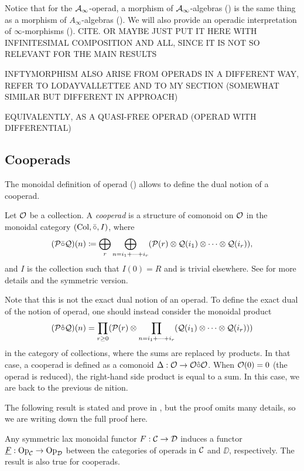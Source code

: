 \documentclass[Thesis.tex]{subfiles}
\begin{document}
Notice that for the $\mathcal{A}_\infty$-operad, a morphism of $\mathcal{A}_\infty$-algebras () is the same thing as a morphism of $A_\infty$-algebras (). We will also provide an operadic interpretation of $\infty$-morphisms (). CITE. OR MAYBE JUST PUT IT HERE WITH INFINITESIMAL COMPOSITION AND ALL, SINCE IT IS NOT SO RELEVANT FOR THE MAIN RESULTS

 INFTYMORPHISM ALSO ARISE FROM OPERADS IN A DIFFERENT WAY, REFER TO LODAYVALLETTEE AND TO MY SECTION (SOMEWHAT SIMILAR BUT DIFFERENT IN APPROACH)

EQUIVALENTLY, AS A QUASI-FREE OPERAD (OPERAD WITH DIFFERENTIAL)


\subsection{Cooperads}

The monoidal definition of operad () allows to define the dual notion of a cooperad.



\begin{defin}
Let ${\mathcal O}$ be a collection. A \emph{cooperad} is a structure of comonoid on ${\mathcal O}$ in the monoidal category $(\mathrm{Col}, \bar{\circ},I)$, where \[(\mathcal{P}\bar{\circ}\mathcal{Q})(n) \coloneqq
\bigoplus_r \bigoplus_{n=i_1+\cdots+i_r}(\mathcal{P}(r)\otimes \mathcal{Q}(i_1)\otimes\cdots\otimes \mathcal{Q}(i_r)),\]
and  $I$ is the collection such that $I(0)=R$ and is trivial elsewhere.
See \cite[\S 5.7.1]{lodayvallette} for more details and the symmetric version.
\end{defin}


Note that this is not the exact dual notion of an operad. To define the exact dual of the notion of operad, one should instead consider
the monoidal product
\[(\mathcal{P}\hat{\circ}\mathcal{Q})(n) =\prod_{r\geq 0}(\mathcal{P}(r)\otimes \prod_{n=i_1+\cdots+i_r}(\mathcal{Q}(i_1)\otimes\cdots\otimes \mathcal{Q}(i_r)))\]
in the category of collections, where the sums are replaced by products. In that case, a cooperad is defined as a comonoid $\Delta:{\mathcal O}\to{\mathcal O}\hat{\circ}{\mathcal O}$.
When ${\mathcal O}(0) = 0$ (the operad is reduced), the right-hand side product is equal to a sum. In this case, we are back to the previous denition.



The following result is stated and prove in \cite[Proposition 3.1.1(a)]{fresse}, but the proof omits many details, so we are writing down the full proof here.
\begin{propo}
Any symmetric lax monoidal functor $F:{\mathcal C}\to{\mathcal D}$ induces a functor $\underline{F}:\mathrm{Op}_{\mathcal C}\to \mathrm{Op}_{\mathcal D}$ between the categories of operads in ${\mathcal C}$ and $\DD$, respectively. The result is also true for cooperads.
\end{propo}
\end{document}
